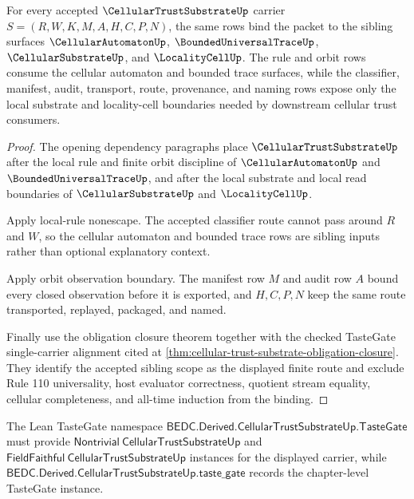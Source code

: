 \begin{theorem}
\label{thm:cellular-trust-substrate-sibling-scope-binding}
For every accepted $\CellularTrustSubstrateUp$ carrier $S=(R,W,K,M,A,H,C,P,N)$, the same rows bind the packet to the sibling surfaces $\CellularAutomatonUp$, $\BoundedUniversalTraceUp$, $\CellularSubstrateUp$, and $\LocalityCellUp$. The rule and orbit rows consume the cellular automaton and bounded trace surfaces, while the classifier, manifest, audit, transport, route, provenance, and naming rows expose only the local substrate and locality-cell boundaries needed by downstream cellular trust consumers.
\end{theorem}
\begin{proof}
The opening dependency paragraphs place $\CellularTrustSubstrateUp$ after the local rule and finite orbit discipline of $\CellularAutomatonUp$ and $\BoundedUniversalTraceUp$, and after the local substrate and local read boundaries of $\CellularSubstrateUp$ and $\LocalityCellUp$.

Apply local-rule nonescape. The accepted classifier route cannot pass around $R$ and $W$, so the cellular automaton and bounded trace rows are sibling inputs rather than optional explanatory context.

Apply orbit observation boundary. The manifest row $M$ and audit row $A$ bound every closed observation before it is exported, and $H,C,P,N$ keep the same route transported, replayed, packaged, and named.

Finally use the obligation closure theorem together with the checked TasteGate single-carrier alignment cited at \autoref{thm:cellular-trust-substrate-obligation-closure}. They identify the accepted sibling scope as the displayed finite route and exclude Rule 110 universality, host evaluator correctness, quotient stream equality, cellular completeness, and all-time induction from the binding.
\end{proof}

The Lean TasteGate namespace $\mathsf{BEDC.Derived.CellularTrustSubstrateUp.TasteGate}$ must provide $\mathsf{Nontrivial}\ \mathsf{CellularTrustSubstrateUp}$ and $\mathsf{FieldFaithful}\ \mathsf{CellularTrustSubstrateUp}$ instances for the displayed carrier, while $\mathsf{BEDC.Derived.CellularTrustSubstrateUp.taste\_gate}$ records the chapter-level TasteGate instance.

